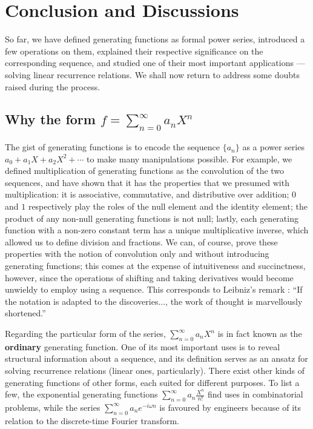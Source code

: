 \documentclass[a4paper, 12pt]{report}
\begin{document}
{\chapter{Conclusion and Discussions}\label{ch:conclusion}}
% 

So far, we have defined generating functions as formal power series, introduced a few operations on them, explained their respective significance on the corresponding sequence, and studied one of their most important applications --- solving linear recurrence relations. We shall now return to address some doubts raised during the process.

\section{Why the form \texorpdfstring{$f = \sum_{n = 0}^\infty a_n X^n$}}

The gist of generating functions is to encode the sequence $\{a_n\}$ as a power series $a_0 + a_1 X + a_2 X^2 + \cdots$ to make many manipulations possible. For example, we defined multiplication of generating functions as the convolution of the two sequences, and have shown that it has the properties that we presumed with multiplication: it is associative, commutative, and distributive over addition; $0$ and $1$ respectively play the roles of the null element and the identity element; the product of any non-null generating functions is not null; lastly, each generating function with a non-zero constant term has a unique multiplicative inverse, which allowed us to define division and fractions. We can, of course, prove these properties with the notion of convolution only and without introducing generating functions; this comes at the expense of intuitiveness and succinctness, however, since the operations of shifting and taking derivatives would become unwieldy to employ using a sequence. This corresponds to Leibniz's remark \autocite[1]{zorich}: ``If the notation is adapted to the discoveries..., the work of thought is marvellously shortened.'' 

Regarding the particular form of the series, $\sum_{n = 0}^\infty a_n X^n$ is in fact known as the \textbf{ordinary} generating function. One of its most important uses is to reveal structural information about a sequence, and its definition serves as an ansatz for solving recurrence relations (linear ones, particularly). There exist other kinds of generating functions of other forms, each suited for different purposes. To list a few, the exponential generating functions $\sum_{n = 0}^\infty a_n \frac{X^n}{n!}$ find uses in combinatorial problems, while the series $\sum_{n = 0}^\infty a_n e^{-i\omega n}$ is favoured by engineers because of its relation to the discrete-time Fourier transform.
\end{document}
